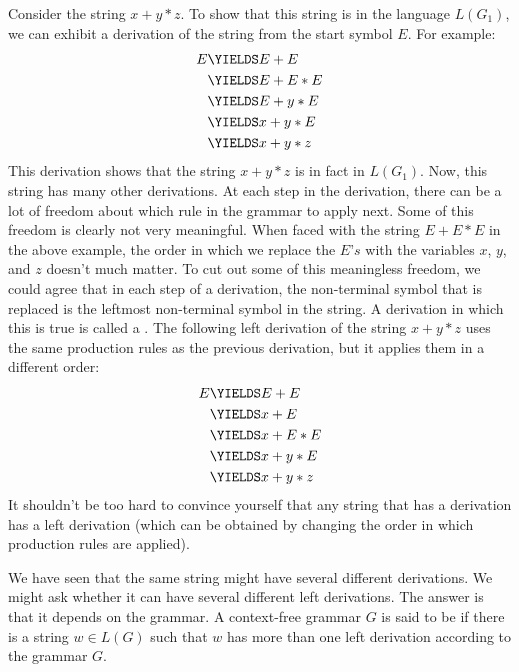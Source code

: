 Consider the string $x+y*z$.  To show that this string is in the
language $L(G_1)$, we can exhibit a derivation of the string
from the start symbol $E$.  For example:
\begin{align*}
   E &\YIELDS E+E\\
     &\YIELDS E+E*E\\
     &\YIELDS E+y*E\\
     &\YIELDS x+y*E\\
     &\YIELDS x+y*z
\end{align*}
This derivation shows that the string $x+y*z$ is in fact in $L(G_1)$.
Now, this string has many other derivations.  At each step in the
derivation, there can be a lot of freedom about which rule in the
grammar to apply next.  Some of this freedom is clearly not very
meaningful.  When faced with the string $E+E*E$ in the above example,
the order in which we replace the $E\text{'}s$ with the variables $x$, $y$,
and $z$ doesn't much matter.  To cut out some of this meaningless
freedom, we could agree that in each step of a derivation, the
non-terminal symbol that is replaced is the leftmost non-terminal
symbol in the string.  A derivation in which this is true is
called a .  The following left derivation
of the string $x+y*z$ uses the same production rules as the previous
derivation, but it applies them in a different order:
\begin{align*}
   E &\YIELDS E+E\\
     &\YIELDS x+E\\
     &\YIELDS x+E*E\\
     &\YIELDS x+y*E\\
     &\YIELDS x+y*z
\end{align*}
It shouldn't be too hard to convince yourself that any string that
has a derivation has a left derivation (which can be obtained
by changing the order in which production rules are applied).

We have seen that the same string might have several different derivations.
We might ask whether it can have several different left derivations.
The answer is that it depends on the grammar.  A context-free
grammar $G$ is said to be 
if there is a string $w\in L(G)$ such that $w$ has more than one
left derivation according to the grammar $G$.

